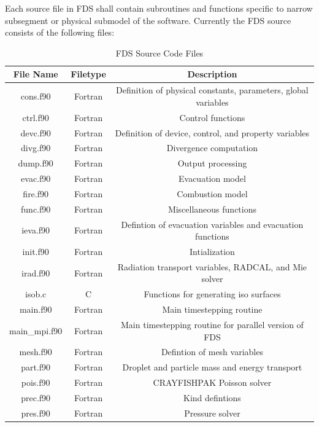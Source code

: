 \documentclass[11pt]{book}
\begin{document}
Each source file in FDS shall contain subroutines and functions specific to narrow subsegment or physical submodel of
the software.  Currently the FDS source consists of the following files:

\begin{table}[ht]
\begin{center}
\caption{FDS Source Code Files}
\label{tbl:sourcecodefiles}
\begin{tabular}{|c|c|c|}
\hline
File Name    & Filetype & Description    \\ \hline 
cons.f90     & Fortran  & Definition of physical constants, parameters, global variables \\ \hline 
ctrl.f90     & Fortran  & Control functions  \\ \hline 
devc.f90     & Fortran  & Definition of device, control, and property variables \\ \hline 
divg.f90     & Fortran  & Divergence computation \\ \hline 
dump.f90     & Fortran  & Output processing \\ \hline 
evac.f90     & Fortran  & Evacuation model \\ \hline 
fire.f90     & Fortran  & Combustion model \\ \hline 
func.f90     & Fortran  & Miscellaneous functions \\ \hline 
ieva.f90     & Fortran  & Defintion of evacuation variables and evacuation functions \\ \hline 
init.f90     & Fortran  & Intialization \\ \hline 
irad.f90     & Fortran  & Radiation transport variables, RADCAL, and Mie solver \\ \hline 
isob.c       & C        & Functions for generating iso surfaces \\ \hline 
main.f90     & Fortran  & Main timestepping routine \\ \hline 
main\_mpi.f90 & Fortran  & Main timestepping routine for parallel version of FDS \\ \hline 
mesh.f90     & Fortran  & Defintion of mesh variables \\ \hline 
part.f90     & Fortran  & Droplet and particle mass and energy transport \\ \hline 
pois.f90     & Fortran  & CRAYFISHPAK Poisson solver \\ \hline 
prec.f90     & Fortran  & Kind defintions \\ \hline 
pres.f90     & Fortran  & Pressure solver \\ \hline 

\end{tabular}
\end{center}
\end{table}
\end{document}
